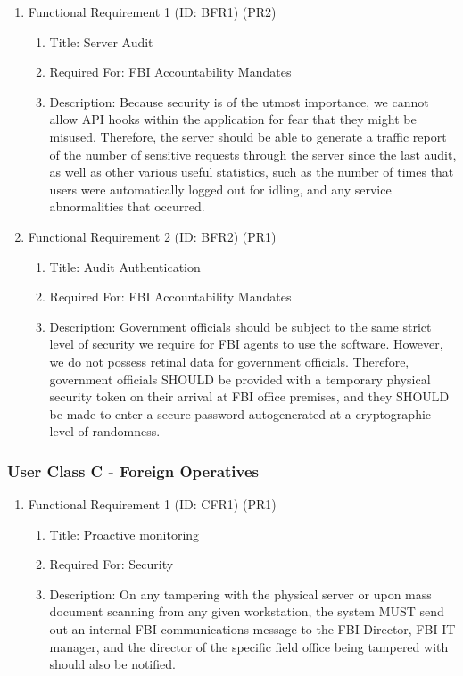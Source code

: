 \documentclass[12pt]{article}
\begin{document}
\begin{enumerate}
    \item Functional Requirement 1 (ID: BFR1) (PR2)
    \begin{enumerate}
        \item Title: Server Audit
        \item Required For: FBI Accountability Mandates
        \item Description: Because security is of the utmost importance, we cannot allow API hooks within the
        application for fear that they might be misused. Therefore, the server should be able to generate a traffic
        report of the number of sensitive requests through the server since the last audit, as well as other various
        useful statistics, such as the number of times that users were automatically logged out for idling, and any
        service abnormalities that occurred.
    \end{enumerate}
    \item Functional Requirement 2 (ID: BFR2) (PR1)
    \begin{enumerate}
        \item Title: Audit Authentication
        \item Required For: FBI Accountability Mandates
        \item Description: Government officials should be subject to the same strict level of security we require for
        FBI agents to use the software. However, we do not possess retinal data for government officials. Therefore,
        government officials SHOULD be provided with a temporary physical security token on their arrival at FBI
        office premises, and they SHOULD be made to enter a secure password autogenerated at a cryptographic level
        of randomness.
    \end{enumerate}
\end{enumerate}

\subsubsection{User Class C - Foreign Operatives}

\begin{enumerate}
    \item Functional Requirement 1 (ID: CFR1) (PR1)
    \begin{enumerate}
        \item Title: Proactive monitoring
        \item Required For: Security
        \item Description: On any tampering with the physical server or upon mass document scanning from any given
        workstation, the system MUST send out an internal FBI communications message to the FBI Director, FBI IT
        manager, and the director of the specific field office being tampered with should also be notified.
    \end{enumerate}
\end{enumerate}
\end{document}
